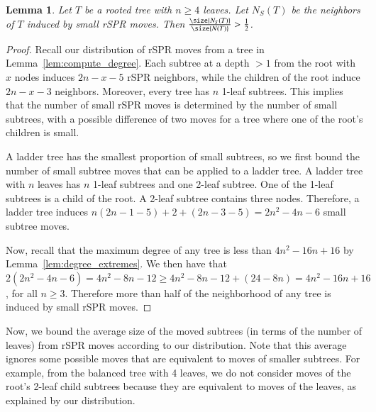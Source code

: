 \documentclass[]{elsarticle}
\newtheorem{lem}[thm]{Lemma}
\begin{document}
\begin{lem}
	Let $T$ be a rooted tree with $n \ge 4$ leaves.
	Let $N_S(T)$ be the neighbors of $T$ induced by small rSPR moves.
	Then $\frac{\size{N_S(T)}}{\size{N(T)}} > \frac{1}{2}$.
	\label{lem:spr_size}
\end{lem}
\begin{proof}
	Recall our distribution of rSPR moves from a tree in Lemma~\ref{lem:compute_degree}.
	Each subtree at a depth $ > 1$ from the root with $x$ nodes induces $2n - x - 5$ rSPR neighbors, while the children of the root induce $2n - x - 3$ neighbors.
	Moreover, every tree has $n$ 1-leaf subtrees.
	This implies that the number of small rSPR moves is determined by the number of small subtrees, with a possible difference of two moves for a tree where one of the root's children is small.

	A ladder tree has the smallest proportion of small subtrees, so we first bound the number of small subtree moves that can be applied to a ladder tree.
	A ladder tree with $n$ leaves has $n$ 1-leaf subtrees and one 2-leaf subtree.
	One of the 1-leaf subtrees is a child of the root.
	A 2-leaf subtree contains three nodes.
	Therefore, a ladder tree induces $n (2n - 1 - 5) + 2 + (2n - 3 - 5) = 2n^2 - 4n - 6$ small subtree moves.

	Now, recall that the maximum degree of any tree is less than $4n^2 - 16n + 16$ by Lemma~\ref{lem:degree_extremes}.
	We then have that $2(2n^2 - 4n - 6) = 4n^2 - 8n - 12 \ge 4n^2 - 8n - 12 + (24 - 8n) = 4n^2 -16n + 16$, for all $n \ge 3$.
	Therefore more than half of the neighborhood of any tree is induced by small rSPR moves.
\end{proof}

Now, we bound the average size of the moved subtrees (in terms of the number of leaves) from rSPR moves according to our distribution. Note that this average ignores some possible moves that are equivalent to moves of smaller subtrees. For example, from the balanced tree with 4 leaves, we do not consider moves of the root's 2-leaf child subtrees because they are equivalent to moves of the leaves, as explained by our distribution.
\end{document}
